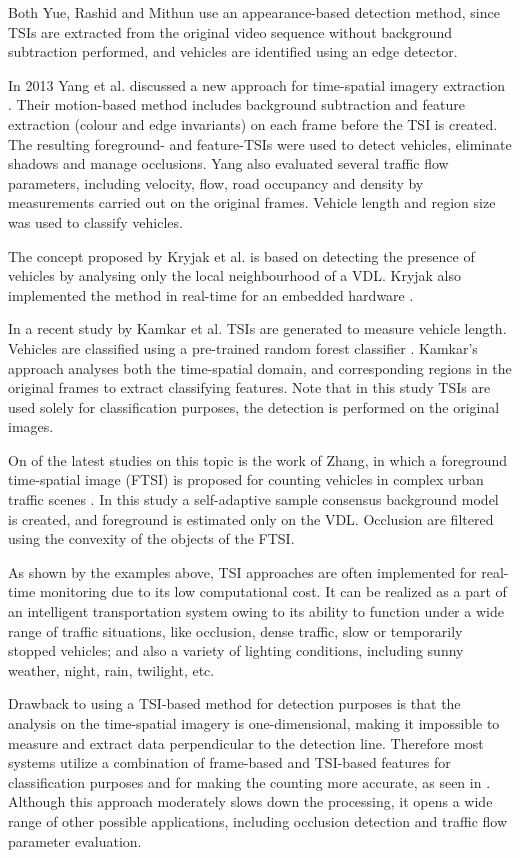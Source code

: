 Both Yue, Rashid and Mithun use an appearance-based detection method, since TSIs are extracted from the original video sequence without background subtraction performed, and vehicles are identified using an edge detector.

In 2013 Yang et al. discussed a new approach for time-spatial imagery extraction \cite{Yang2013a}.
Their motion-based method includes background subtraction and feature extraction (colour and edge invariants) on each frame before the TSI is created.
The resulting foreground- and feature-TSIs were used to detect vehicles, eliminate shadows and manage occlusions.
Yang also evaluated several traffic flow parameters, including velocity, flow, road occupancy and density by measurements carried out on the original frames. 
Vehicle length and region size was used to classify vehicles.

The concept proposed by Kryjak et al. is based on detecting the presence of vehicles by analysing only the local neighbourhood of a VDL.
Kryjak also implemented the method in real-time for an embedded hardware \cite{Kryjak2014}.

In a recent study by Kamkar et al. TSIs are generated to measure vehicle length. Vehicles are classified using a pre-trained random forest classifier \cite{Kamkar2016}. 
Kamkar's approach analyses both the time-spatial domain, and corresponding regions in the original frames to extract classifying features.
Note that in this study TSIs are used solely for classification purposes, the detection is performed on the original images.

On of the latest studies on this topic is the work of Zhang, in which a foreground time-spatial image (FTSI) is proposed for counting vehicles in complex urban traffic scenes \cite{Zhang2016}.
In this study a self-adaptive sample consensus background model is created, and foreground is estimated only on the VDL.
Occlusion are filtered using the convexity of the objects of the FTSI.

As shown by the examples above, TSI approaches are often implemented for real-time monitoring due to its low computational cost.
It can be realized as a part of an intelligent transportation system owing to its ability to function under a wide range of traffic situations, like occlusion, dense traffic, slow or temporarily stopped vehicles; and also a variety of lighting conditions, including sunny weather, night, rain, twilight, etc.

Drawback to using a TSI-based method for detection purposes is that the analysis on the time-spatial imagery is one-dimensional, making it impossible to measure and extract data perpendicular to the detection line.
Therefore most systems utilize a combination of frame-based and TSI-based features for classification purposes and for making the counting more accurate, as seen in \cite{Kryjak2014, Yang2013a}. 
Although this approach moderately slows down the processing, it opens a wide range of other possible applications, including occlusion detection and traffic flow parameter evaluation.

